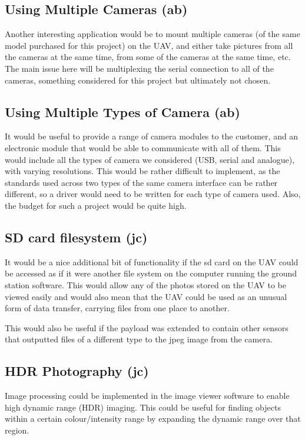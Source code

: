\subsection{Using Multiple Cameras (ab)}

Another interesting application would be to mount multiple cameras (of the same 
model purchased for this project) on the UAV, and either take pictures from all 
the cameras at the same time, from some of the cameras at the same time, etc. 
The main issue here will be multiplexing the serial connection to all of the 
cameras, something considered for this project but ultimately not chosen.

\subsection{Using Multiple Types of Camera (ab)}

It would be useful to provide a range of camera modules to the customer, and 
an electronic module that would be able to communicate with all of them. This 
would include all the types of camera we considered (USB, serial and analogue), 
with varying resolutions. This would be rather difficult to implement, as the 
standards used across two types of the same camera interface can be rather 
different, so a driver would need to be written for each type of camera used. 
Also, the budget for such a project would be quite high.

\subsection{SD card filesystem (jc)}

It would be a nice additional bit of functionality if the sd card on the UAV could be accessed as if it were another file system on the computer running the ground station software. This would allow any of the photos stored on the UAV to be viewed easily and would also mean that the UAV could be used as an unusual form of data transfer, carrying files from one place to another.

This would also be useful if the payload was extended to contain other sensors that outputted files of a different type to the jpeg image from the camera.

\subsection{HDR Photography (jc)}

Image processing could be implemented in the image viewer software to enable high dynamic range (HDR) imaging. This could be useful for finding objects within a certain colour/intensity range by expanding the dynamic range over that region.

